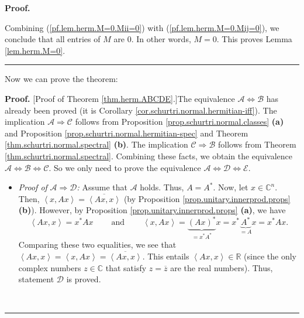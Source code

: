 \documentclass[numbers=enddot,12pt,final,onecolumn,notitlepage]{scrartcl}%
\numberwithin{exer}{subsection}
\theoremstyle{definition}
\newenvironment{proof}[1][Proof]{\noindent\textbf{#1.} }{\ \rule{0.5em}{0.5em}}
\begin{document}
\begin{proof}
\begin{itemize}
\end{itemize}

Combining (\ref{pf.lem.herm.M=0.Mii=0}) with (\ref{pf.lem.herm.M=0.Mij=0}), we
conclude that all entries of $M$ are $0$. In other words, $M=0$. This proves
Lemma \ref{lem.herm.M=0}.
\end{proof}

Now we can prove the theorem:

\begin{proof}
[Proof of Theorem \ref{thm.herm.ABCDE}.]The equivalence $\mathcal{A}%
\Longleftrightarrow\mathcal{B}$ has already been proved (it is Corollary
\ref{cor.schurtri.normal.hermitian-iff}). The implication $\mathcal{A}%
\Longrightarrow\mathcal{C}$ follows from Proposition
\ref{prop.schurtri.normal.classes} \textbf{(a)} and Proposition
\ref{prop.schurtri.normal.hermitian-spec} and Theorem
\ref{thm.schurtri.normal.spectral} \textbf{(b)}. The implication
$\mathcal{C}\Longrightarrow\mathcal{B}$ follows from Theorem
\ref{thm.schurtri.normal.spectral}. Combining these facts, we obtain the
equivalence $\mathcal{A}\Longleftrightarrow\mathcal{B}\Longleftrightarrow
\mathcal{C}$. So we only need to prove the equivalence $\mathcal{A}%
\Longleftrightarrow\mathcal{D}\Longleftrightarrow\mathcal{E}$.

\begin{itemize}
\item \textit{Proof of }$\mathcal{A}\Longrightarrow\mathcal{D}$\textit{:}
Assume that $\mathcal{A}$ holds. Thus, $A=A^{\ast}$. Now, let $x\in
\mathbb{C}^{n}$. Then, $\left\langle x,Ax\right\rangle =\overline{\left\langle
Ax,x\right\rangle }$ (by Proposition \ref{prop.unitary.innerprod.props}
\textbf{(b)}). However, by Proposition \ref{prop.unitary.innerprod.props}
\textbf{(a)}, we have%
\[
\left\langle Ax,x\right\rangle =x^{\ast}Ax\ \ \ \ \ \ \ \ \ \ \text{and}%
\ \ \ \ \ \ \ \ \ \ \left\langle x,Ax\right\rangle =\underbrace{\left(
Ax\right)  ^{\ast}}_{=x^{\ast}A^{\ast}}x=x^{\ast}\underbrace{A^{\ast}}%
_{=A}x=x^{\ast}Ax.
\]
Comparing these two equalities, we see that $\left\langle Ax,x\right\rangle
=\left\langle x,Ax\right\rangle =\overline{\left\langle Ax,x\right\rangle }$.
This entails $\left\langle Ax,x\right\rangle \in\mathbb{R}$ (since the only
complex numbers $z\in\mathbb{C}$ that satisfy $z=\overline{z}$ are the real
numbers). Thus, statement $\mathcal{D}$ is proved.


\end{itemize}
\end{proof}
\end{document}
